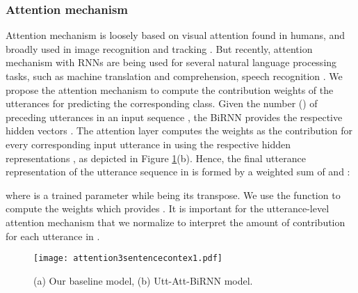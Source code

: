 \documentclass[a4paper]{article}
\begin{document}
\subsubsection{Attention mechanism}
\label{sec:utt_att}

Attention mechanism is loosely based on visual attention found in humans, and broadly used in image recognition and tracking \cite{NIPS2010_4089,denil2012learning}. 
But recently, attention mechanism with RNNs are being used for several natural language processing tasks, such as machine translation and comprehension, speech recognition \cite{bahdanau2014neural,vinyals2015grammar,chorowski2015attention}. 
We propose the attention mechanism to compute the contribution weights of the utterances for predicting the corresponding class. 
Given the number () of preceding utterances in an input sequence , the BiRNN provides the respective hidden vectors . 
The attention layer computes the weights  as the contribution for every corresponding input utterance in  using the respective hidden representations , as depicted in Figure \ref{fig:proposed_model}(b). 
Hence, the final utterance representation  of the utterance sequence in  is formed by a weighted sum of  and :
 
 
 
where  is a trained parameter while  being its transpose. We use the  function to compute the weights which provides . It is important for the utterance-level attention mechanism that we normalize  to interpret the amount of contribution for each utterance in . 

\begin{figure}[t]
  \centering
  \texttt{[image: attention3sentencecontex1.pdf]}
  \caption{(a) Our baseline model, (b) Utt-Att-BiRNN model.}
  \label{fig:proposed_model}
\end{figure}
\end{document}
